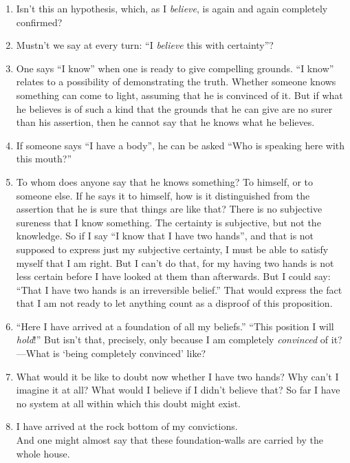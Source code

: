 \documentclass{book}
\begin{document}
\begin{enumerate}
\item
Isn't this an hypothesis, which, as I \emph{believe}, is again and again
completely confirmed?

\item
Mustn't we say at every turn: ``I \emph{believe} this with certainty''?

\item
One says ``I know'' when one is ready to give compelling grounds. ``I know''
relates to a possibility of demonstrating the truth. Whether someone knows
something can come to light, assuming that he is convinced of it.  But if what
he believes is of such a kind that the grounds that he can give are no surer
than his assertion, then he cannot say that he knows what he believes.

\item
If someone says ``I have a body'', he can be asked ``Who is speaking here with
this mouth?''

\item
To whom does anyone say that he knows something? To himself, or to someone
else. If he says it to himself, how is it distinguished from the assertion that
he is sure that things are like that? There is no subjective sureness that I
know something. The certainty is subjective, but not the knowledge. So if I say
``I know that I have two hands'', and that is not supposed to express just my
subjective certainty, I must be able to satisfy myself that I am right. But I
can't do that, for my having two hands is not less certain before I have looked
at them than afterwards. But I could say: ``That I have two hands is an
irreversible belief.'' That would express the fact that I am not ready to let
anything count as a disproof of this proposition.

\item
``Here I have arrived at a foundation of all my beliefs.'' ``This position I
will \emph{hold}!'' But isn't that, precisely, only because I am completely
\emph{convinced} of it?---What is `being completely convinced' like?

\item
What would it be like to doubt now whether I have two hands? Why can't I
imagine it at all? What would I believe if I didn't believe that? So far I have
no system at all within which this doubt might exist.

\item
I have arrived at the rock bottom of my convictions. \\
And one might almost say that these foundation-walls are carried by the whole
house.


\end{enumerate}
\end{document}
